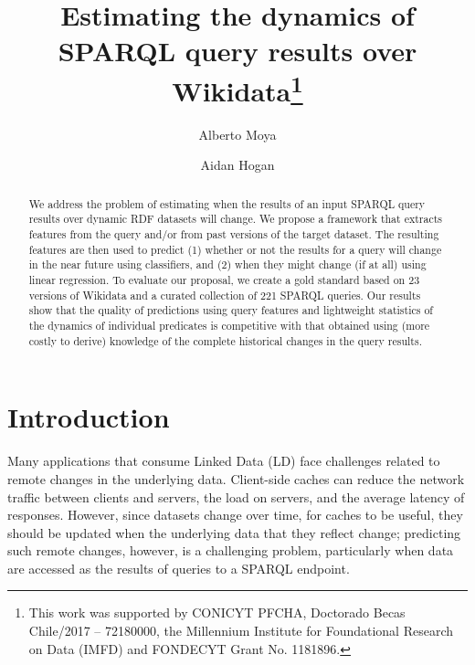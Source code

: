 \documentclass[runningheads]{llncs}
\begin{document}
%
\title{Estimating the dynamics of\\SPARQL query results over Wikidata\thanks{This work was supported by CONICYT PFCHA, Doctorado Becas Chile/2017 -- 72180000, the Millennium Institute for Foundational Research on Data (IMFD) and FONDECYT Grant No. 1181896.}}
%
%
\author{Alberto Moya \and 
Aidan Hogan}
%
%
%
\maketitle              %
%
\begin{abstract}
We address the problem of estimating when the results of an input SPARQL query results over dynamic RDF datasets will change. We propose a framework that extracts features from the query and/or from past versions of the target dataset. The resulting features are then used to predict (1) whether or not the results for a query will change in the near future using classifiers, and (2) when they might change (if at all) using linear regression. To evaluate our proposal, we create a gold standard based on 23 versions of Wikidata and a curated collection of 221 SPARQL queries. Our results show that the quality of predictions using query features and lightweight statistics of the dynamics of individual predicates is competitive with that obtained using (more costly to derive) knowledge of the complete historical changes in the query results.

\end{abstract}
%
%
\section{Introduction}
\label{sec:intro}
%
Many applications that consume Linked Data (LD) face challenges related to remote changes in the underlying data. Client-side caches can reduce the network traffic between clients and servers, the load on servers, and the average latency of responses. However, since datasets change over time, for caches to be useful, they should be updated when the underlying data that they reflect change; predicting such remote changes, however, is a challenging problem, particularly when data are accessed as the results of queries to a SPARQL endpoint.
\end{document}
